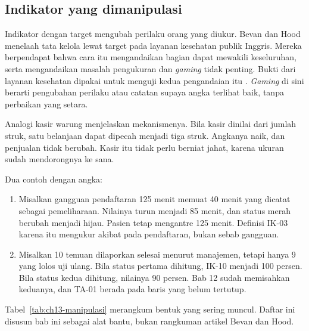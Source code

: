 \subsection*{Indikator yang dimanipulasi}

Indikator dengan target mengubah perilaku orang yang diukur. Bevan dan Hood menelaah tata kelola
lewat target pada layanan kesehatan publik Inggris. Mereka berpendapat bahwa cara itu mengandaikan
bagian dapat mewakili keseluruhan, serta mengandaikan masalah pengukuran dan \textit{gaming} tidak
penting. Bukti dari layanan kesehatan dipakai untuk menguji kedua pengandaian itu
\cite{c13-bevan2006}. \textit{Gaming} di sini berarti pengubahan perilaku atau catatan supaya angka
terlihat baik, tanpa perbaikan yang setara.

Analogi kasir warung menjelaskan mekanismenya. Bila kasir dinilai dari jumlah struk, satu belanjaan
dapat dipecah menjadi tiga struk. Angkanya naik, dan penjualan tidak berubah. Kasir itu tidak perlu
berniat jahat, karena ukuran sudah mendorongnya ke sana.

Dua contoh dengan angka:
\begin{enumerate}
  \item Misalkan gangguan pendaftaran 125 menit memuat 40 menit yang dicatat sebagai pemeliharaan.
  Nilainya turun menjadi 85 menit, dan status merah berubah menjadi hijau. Pasien tetap mengantre
  125 menit. Definisi IK-03 karena itu mengukur akibat pada pendaftaran, bukan sebab gangguan.
  \item Misalkan 10 temuan dilaporkan selesai menurut manajemen, tetapi hanya 9 yang lolos uji
  ulang. Bila status pertama dihitung, IK-10 menjadi 100 persen. Bila status kedua dihitung,
  nilainya 90 persen. Bab 12 sudah memisahkan keduanya, dan TA-01 berada pada baris yang belum
  tertutup.
\end{enumerate}

Tabel~\ref{tab:ch13-manipulasi} merangkum bentuk yang sering muncul. Daftar ini disusun bab ini
sebagai alat bantu, bukan rangkuman artikel Bevan dan Hood.

